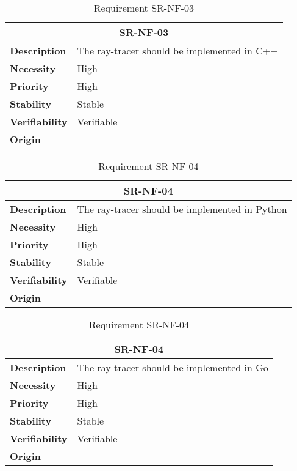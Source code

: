 \begin{table}[H]
    \centering
    \begin{tabular}{l p{10cm}}
        \toprule
        \multicolumn{2}{c}{SR-NF-03} \\
        \toprule
        \textbf{Description}        & The ray-tracer should be implemented in C++ \\
        \textbf{Necessity}          &  High \\
        \textbf{Priority}           &  High \\
        \textbf{Stability}          &  Stable \\
        \textbf{Verifiability}      & Verifiable \\
        \textbf{Origin}             &  \textit{\nameref{tab:ur-re-01}} \\
    \end{tabular}
    \caption{Requirement SR-NF-03}
    \label{tab:sr-nf-03}
\end{table}

\begin{table}[H]
    \centering
    \begin{tabular}{l p{10cm}}
        \toprule
        \multicolumn{2}{c}{SR-NF-04} \\
        \toprule
        \textbf{Description}        & The ray-tracer should be implemented in Python \\
        \textbf{Necessity}          &  High \\
        \textbf{Priority}           &  High \\
        \textbf{Stability}          &  Stable \\
        \textbf{Verifiability}      & Verifiable \\
        \textbf{Origin}             &  \textit{\nameref{tab:ur-re-01}} \\
    \end{tabular}
    \caption{Requirement SR-NF-04}
    \label{tab:sr-nf-04}
\end{table}

\begin{table}[H]
    \centering
    \begin{tabular}{l p{10cm}}
        \toprule
        \multicolumn{2}{c}{SR-NF-04} \\
        \toprule
        \textbf{Description}        & The ray-tracer should be implemented in Go \\
        \textbf{Necessity}          &  High \\
        \textbf{Priority}           &  High \\
        \textbf{Stability}          &  Stable \\
        \textbf{Verifiability}      & Verifiable \\
        \textbf{Origin}             &  \textit{\nameref{tab:ur-re-01}} \\
    \end{tabular}
    \caption{Requirement SR-NF-04}
    \label{tab:sr-nf-04}
\end{table}

